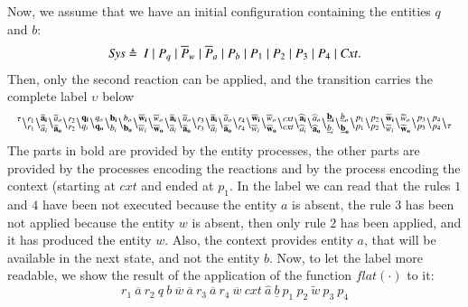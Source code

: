 Now, we assume that we have an initial configuration containing the entities $q$ and $b$:
\[
\begin{array}{lcl}
\mathit{Sys}  \defeq \ %
 I\mid P_q \mid \overline{P}_w  \mid  \overline{P}_a  \mid P_b  \mid  P_1  \mid  P_2  \mid  P_3  \mid P_4  \mid \mathit{Cxt}.
\end{array}
\] 
Then, only the second reaction can be applied, and the transition carries the complete label $\upsilon$ below
{\tiny
\[
 {}^{\tau}
 \backslash_{r_1}^{r_1}
 \backslash_{\overline{a}_i}^{\bf  \overline{a}_i}\backslash_{\bf \overline{a}_o}^{\overline{a}_o}
 \backslash_{r_2}^{r_2}
 \backslash_{q_i}^{\bf q_i}\backslash_{\bf q_o}^{q_o}
 \backslash_{b_i}^{\bf b_i}\backslash_{\bf b_o}^{b_o}
 \backslash_{\overline{w}_i}^{\bf \overline{w}_i}\backslash_{\bf \overline{w}_o}^{\overline{w}_o}
 \backslash_{\overline{a}_i}^{\bf \overline{a}_i}\backslash_{\bf \overline{a}_o}^{\overline{a}_o}
 \backslash_{r_3}^{r_3}
 \backslash_{\overline{a}_i}^{\bf \overline{a}_i}\backslash_{\bf \overline{a}_o}^{\overline{a}_o}
 \backslash_{r_4}^{r_4}
 \backslash_{\overline{w}_i}^{\bf \overline{w}_i}\backslash_{\bf \overline{w}_o}^{\overline{w}_o}
 \backslash_{\mathit{cxt}}^{\mathit{cxt}}
 \backslash_{\widehat{a}_i}^{\bf \widehat{a}_i}\backslash_{\bf \widehat{a}_o}^{\widehat{a}_o}
 \backslash_{\underline{b}_i}^{\bf \underline{b}_i}\backslash_{\bf \underline{b}_o}^{\underline{b}_o}
 \backslash_{p_1}^{p_1}
 \backslash_{p_2}^{p_2}
 \backslash_{\widetilde{w}_i}^{\bf \widetilde{w}_i}\backslash_{\bf \widetilde{w}_o}^{\widetilde{w}_o}
 \backslash_{p_3}^{p_3}
 \backslash_{p_4}^{p_4}
 \backslash_{\tau}
\]}
The parts in bold are provided by the entity processes, the other parts are provided by the processes encoding the reactions and by the process encoding the context (starting at $\mathit{cxt}$ and ended at $p_1$.
In the label we can read that the rules $1$ and $4$ have been not executed because the entity $a$ is absent, 
the rule $3$ has been not applied because the entity $w$ is absent, then only rule $2$ has been applied, and it has produced the entity $w$. Also,  the context provides entity $a$, that will be available in the next state, and not the entity $b$.
Now, to let the label more readable, we show the result of the application of the function $flat(\cdot)$ to it:
\[
r_1~\overline{a}~r_2~q~b~\overline{w}~\overline{a}~r_3~\overline{a}~r_4~\overline{w}~\mathit{cxt}~\widehat{a}~\underline{b}~p_1~p_2~\widetilde{w}~p_3~p_4\]


